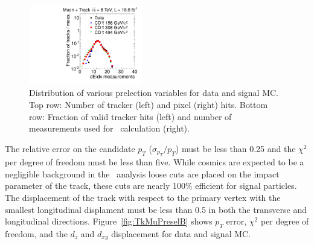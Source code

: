 \begin{figure}
  \includegraphics[clip=true, trim=0.0cm 0cm 2.8cm 0cm, width=0.44\textwidth]{figures/tkmu/Selection_Comp_8TeV_GMStau_NOM_BS}
  \caption{Distribution of various prelection variables for data and signal MC.
Top row: Number of tracker (left) and pixel (right) hits.
Bottom row: Fraction of valid tracker hits (left) and number of measurements used for \dedx\ calculation (right).
    \label{fig:TkMuPreselA}}
\end{figure}

The relative error on the candidate $p_T$ ($\sigma_{p_T}/p_T$) must be less than 0.25 and the $\chi^2$ per degree of freedom must be less than five.
While cosmics are expected to be a negligible background in the \tktof\ analysis loose cuts are placed on the impact parameter of the track, 
these cuts are nearly 100\% efficient for signal particles.
The displacement of the track with respect to the primary vertex
with the smallest longitudinal displament must be less than 0.5 in both the transverse and longitudinal directions.
Figure~\ref{fig:TkMuPreselB} shows $p_T$ error, $\chi^2$ per degree of freedom, and the $d_z$ and $d_{xy}$ displacement for data and signal MC.

